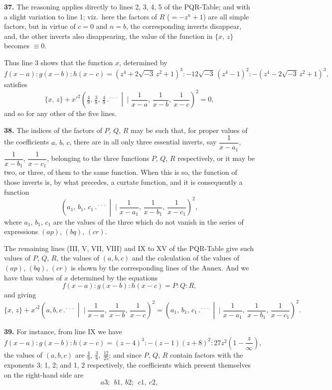 \documentclass[11pt]{article}
\newcommand{\artno}[1]{\textbf{#1.}\quad}
\begin{document}
\newpage
\artno{37} The reasoning applies directly to lines 2, 3, 4, 5 of the PQR-Table; and
with a slight variation to line 1; viz.\ here the factors of $R$ ($=-z^{n}+1$) are all simple
factors, but in virtue of $c = 0$ and $n = b$, the corresponding inverts disappear, and, the
other inverts also disappearing, the value of the function in $\{x,\,z\}$ becomes $\equiv 0$.

Thus line 3 shows that the function $x$, determined by
\[
   f(x-a) : g(x-b) : h(x-c) = (z^{4} + 2\sqrt{-3}\,z^{2} + 1)^{3} : -12\sqrt{-3}\,(z^{4} - 1)^{2} : -(z^{4} - 2\sqrt{-3}\,z^{2} + 1)^{3},
\]
satisfies
\[
   \{x,\,z\} + x'^{2}\!\left(\tfrac{4}{9},\,\tfrac{3}{8},\,\tfrac{4}{9} \,.{}^{\!\cdot\!\cdot\!\cdot}\,\middle|\!\!\!\mid \frac{1}{x-a},\,\frac{1}{x-b},\,\frac{1}{x-c}\right)^{\!2} = 0,
\]
and so for any other of the five lines.

\artno{38} The indices of the factors of $P$, $Q$, $R$ may be such that, for proper values
of the coefficients $a$, $b$, $c$, there are in all only three essential inverts, say $\dfrac{1}{x-a_{1}}$,
$\dfrac{1}{x-b_{1}}$, $\dfrac{1}{x-c_{1}}$, belonging to the three functions $P$, $Q$, $R$ respectively, or it may be
two, or three, of them to the same function. When this is so, the function of those
inverts is, by what precedes, a curtate function, and it is consequently a function
\[
   \left(a_{1},\,b_{1},\,c_{1} \,.{}^{\!\cdot\!\cdot\!\cdot}\,\middle|\!\!\!\mid \frac{1}{x-a_{1}},\,\frac{1}{x-b_{1}},\,\frac{1}{x-c_{1}}\right)^{\!2},
\]
where $a_{1}$, $b_{1}$, $c_{1}$ are the values of the three which do not vanish in the series of
expressions $(ap)$, $(bq)$, $(cr)$.

The remaining lines (III, V, VII, VIII) and IX to XV of the PQR-Table give
such values of $P$, $Q$, $R$, the values of $(a, b, c)$ and the calculation of the values of
$(ap)$, $(bq)$, $(cr)$ is shown by the corresponding lines of the Annex. And we have thus
values of $x$ determined by the equations
\[
   f(x-a) : g(x-b) : h(x-c) = P : Q : R,
\]
and giving
\[
   \{x,\,z\} + x'^{2}\!\left(a, b, c \,.{}^{\!\cdot\!\cdot\!\cdot}\,\middle|\!\!\!\mid \frac{1}{x-a},\,\frac{1}{x-b},\,\frac{1}{x-c}\right)^{\!2} = \left(a_{1},\,b_{1},\,c_{1} \,.{}^{\!\cdot\!\cdot\!\cdot}\,\middle|\!\!\!\mid \frac{1}{x-a_{1}},\,\frac{1}{x-b_{1}},\,\frac{1}{x-c_{1}}\right)^{\!2}.
\]

\artno{39} For instance, from line IX we have
\[
   f(x-a) : g(x-b) : h(x-c) = (z-4)^{3} : -(z-1)(z+8)^{2} : 27 z^{2}\!\left(1 - \frac{z}{\infty}\right),
\]
the values of $(a, b, c)$ are $\tfrac{4}{9},\ \tfrac{3}{8},\ \tfrac{12}{25}$; and since $P$, $Q$, $R$ contain factors with the
exponents 3; 1, 2; and 1, 2 respectively, the coefficients which present themselves
on the right-hand side are
\[
   a3;\ \ b1,\ b2;\ \ c1,\ c2,
\]
\end{document}
